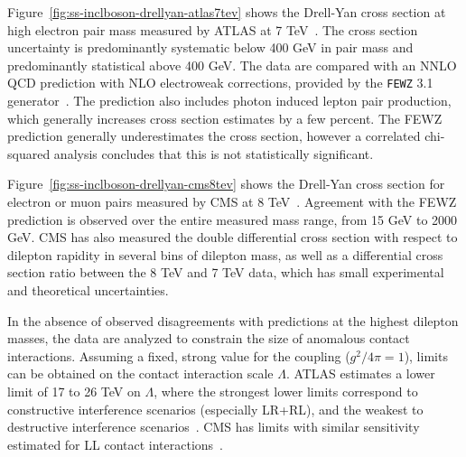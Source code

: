 Figure~\ref{fig:ss-inclboson-drellyan-atlas7tev} shows the Drell-Yan cross
section at high electron pair mass measured by ATLAS at 7 TeV~\cite{Aad:2013iua}.
The cross section uncertainty is predominantly systematic below 400 GeV in pair
mass and predominantly statistical above 400 GeV.  The data are compared with an NNLO QCD
prediction with NLO electroweak corrections, provided by the \texttt{FEWZ} 3.1 generator~\cite{Melnikov:2006kv,Gavin:2010az,Li:2012wna}.
The prediction also includes photon induced lepton pair production, which generally
increases cross section estimates by a few percent. The FEWZ prediction generally underestimates the cross section,
however a correlated chi-squared analysis concludes that this is not statistically significant.

Figure~\ref{fig:ss-inclboson-drellyan-cms8tev} shows the Drell-Yan cross section for electron or muon pairs
measured by CMS at 8 TeV~\cite{CMS:2014jea}.  Agreement with the FEWZ prediction is observed over the
entire measured mass range, from 15 GeV to 2000 GeV.  CMS has also measured the double differential
cross section with respect to dilepton rapidity in several bins of dilepton mass, as well as a differential
cross section ratio between the 8 TeV and 7 TeV data, which has small experimental and theoretical uncertainties.

In the absence of observed disagreements with predictions at the highest dilepton masses, the data are analyzed
to constrain the size of anomalous contact interactions. Assuming a fixed, strong value for the coupling ($g^2/4\pi = 1$),
limits can be obtained on the contact interaction scale $\Lambda$.  ATLAS estimates a lower limit of 17 to 26 TeV on $\Lambda$, where the
strongest lower limits correspond to constructive interference scenarios (especially LR+RL), and the weakest to destructive interference scenarios~\cite{Aad:2014wca}.
CMS has limits with similar sensitivity estimated for LL contact interactions~\cite{Khachatryan:2014fba}.


